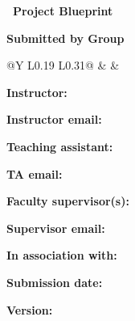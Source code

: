 \thispagestyle{empty}
{\large\bfseries\color{SmithBlue}\MakeUppercase{\FacultyName}\par}
{\normalsize\InstitutionName\par}
{\normalsize\DepartmentName\par}

\vspace{0.52in}
\PrintProjectLogo
{\Large\bfseries\color{QueensBurgundy}\CourseShortCode\ Project Blueprint\par}
\vspace{9pt}
{\LARGE\bfseries\color{QueensBurgundy}\ProjectTitle\par}
\vspace{8pt}
{\normalsize\AcademicTerms\par}
\GuideLabel

\vspace{12pt}
\textbf{Submitted by Group} \GroupNumber
\begin{TableBlock}
\begin{tabularx}{\linewidth}{@{}Y L{0.19\linewidth} L{0.31\linewidth}@{}}
 &  &  \\
\TeamMembers
\bottomrule
\end{tabularx}
\end{TableBlock}

\begin{singlespace}
\textbf{Instructor:} \Instructor\par
\textbf{Instructor email:} \InstructorEmail\par
\textbf{Teaching assistant:} \TA\par
\textbf{TA email:} \TAEmail\par
\textbf{Faculty supervisor(s):} \FacultySupervisor\par
\textbf{Supervisor email:} \SupervisorEmail\par
\ifincludeindustrypartner
\textbf{In association with:} \IndustryPartner\par
\fi
\textbf{Submission date:} \SubmissionDate\par
\textbf{Version:} \DocumentVersion\par
\end{singlespace}

\vfill
{}
\clearpage
